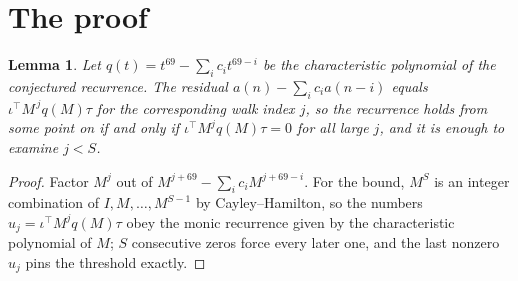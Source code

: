\documentclass[11pt,a4paper]{article}
\theoremstyle{plain}
\newtheorem{lemma}[theorem]{Lemma}
\theoremstyle{definition}
\begin{document}
\section{The proof}

\begin{lemma}\label{lem:crit}
Let $q(t)=t^{69}-\sum_i c_it^{69-i}$ be the characteristic polynomial of the
conjectured recurrence. The residual $a(n)-\sum_ic_ia(n-i)$ equals
$\iota^{\!\top}M^{\,j}q(M)\tau$ for the corresponding walk index $j$, so the recurrence
holds from some point on if and only if $\iota^{\!\top}M^{j}q(M)\tau=0$ for all large $j$,
and it is enough to examine $j<S$.
\end{lemma}

\begin{proof}
Factor $M^{j}$ out of $M^{j+69}-\sum_ic_iM^{j+69-i}$. For the bound, $M^{S}$
is an integer combination of $I,M,\dots,M^{S-1}$ by Cayley--Hamilton, so the numbers
$u_j=\iota^{\!\top}M^{j}q(M)\tau$ obey the monic recurrence given by the characteristic
polynomial of $M$; $S$ consecutive zeros force every later one, and the last nonzero $u_j$
pins the threshold exactly.
\end{proof}
\end{document}
